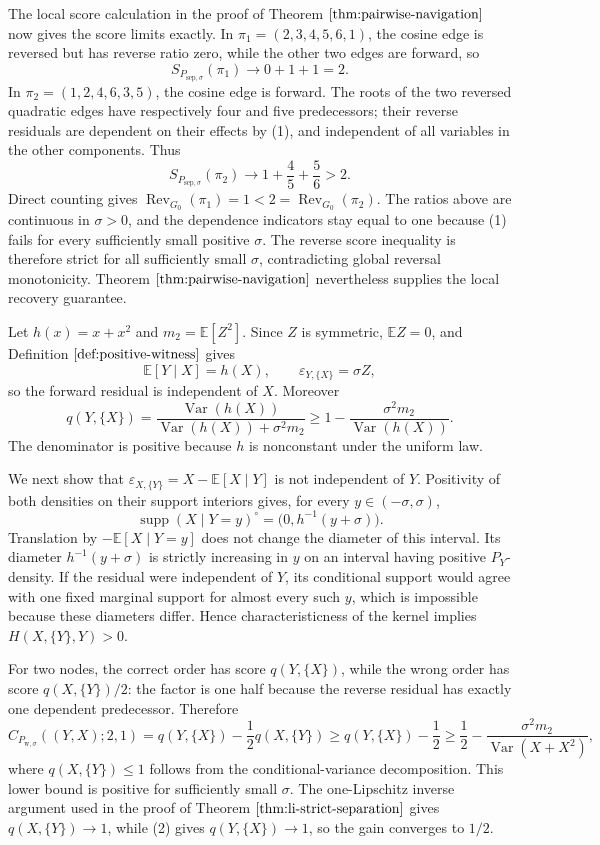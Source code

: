 The local score calculation in the proof of Theorem \(\ref{thm:pairwise-navigation}\) now gives the score limits exactly.  In \(\pi_1=(2,3,4,5,6,1)\), the cosine edge is reversed but has reverse ratio zero, while the other two edges are forward, so
\[
 S_{P_{\mathrm{sep},\sigma}}(\pi_1)\longrightarrow 0+1+1=2.
\]
In \(\pi_2=(1,2,4,6,3,5)\), the cosine edge is forward.  The roots of the two reversed quadratic edges have respectively four and five predecessors; their reverse residuals are dependent on their effects by (1), and independent of all variables in the other components.  Thus
\[
 S_{P_{\mathrm{sep},\sigma}}(\pi_2)\longrightarrow
 1+\frac45+\frac56>2.
\]
Direct counting gives \(\operatorname{Rev}_{G_0}(\pi_1)=1<2=\operatorname{Rev}_{G_0}(\pi_2)\).  The ratios above are continuous in \(\sigma>0\), and the dependence indicators stay equal to one because (1) fails for every sufficiently small positive \(\sigma\).  The reverse score inequality is therefore strict for all sufficiently small \(\sigma\), contradicting global reversal monotonicity.  Theorem \(\ref{thm:pairwise-navigation}\) nevertheless supplies the local recovery guarantee.

Let \(h(x)=x+x^2\) and \(m_2=\mathbb E[Z^2]\).  Since \(Z\) is symmetric, \(\mathbb E Z=0\), and Definition \(\ref{def:positive-witness}\) gives
\[
 \mathbb E[Y\mid X]=h(X),\qquad
 \varepsilon_{Y,\{X\}}=\sigma Z,
\]
so the forward residual is independent of \(X\).  Moreover
\[
 q(Y,\{X\})
 =\frac{\operatorname{Var}(h(X))}
 {\operatorname{Var}(h(X))+\sigma^2m_2}
 \ge 1-\frac{\sigma^2m_2}{\operatorname{Var}(h(X))}. \tag{2}
\]
The denominator is positive because \(h\) is nonconstant under the uniform law.

We next show that \(\varepsilon_{X,\{Y\}}=X-\mathbb E[X\mid Y]\) is not independent of \(Y\).  Positivity of both densities on their support interiors gives, for every \(y\in(-\sigma,\sigma)\),
\[
 \operatorname{supp}(X\mid Y=y)^{\circ}
 =\bigl(0,h^{-1}(y+\sigma)\bigr).
\]
Translation by \(-\mathbb E[X\mid Y=y]\) does not change the diameter of this interval.  Its diameter \(h^{-1}(y+\sigma)\) is strictly increasing in \(y\) on an interval having positive \(P_Y\)-density.  If the residual were independent of \(Y\), its conditional support would agree with one fixed marginal support for almost every such \(y\), which is impossible because these diameters differ.  Hence characteristicness of the kernel implies \(H(X,\{Y\},Y)>0\).

For two nodes, the correct order has score \(q(Y,\{X\})\), while the wrong order has score \(q(X,\{Y\})/2\): the factor is one half because the reverse residual has exactly one dependent predecessor.  Therefore
\[
 C_{P_{\mathrm w,\sigma}}((Y,X);2,1)
 =q(Y,\{X\})-\frac12q(X,\{Y\})
 \ge q(Y,\{X\})-\frac12
 \ge\frac12-\frac{\sigma^2m_2}{\operatorname{Var}(X+X^2)},
\]
where \(q(X,\{Y\})\le1\) follows from the conditional-variance decomposition.  This lower bound is positive for sufficiently small \(\sigma\).  The one-Lipschitz inverse argument used in the proof of Theorem \(\ref{thm:li-strict-separation}\) gives \(q(X,\{Y\})\to1\), while (2) gives \(q(Y,\{X\})\to1\), so the gain converges to \(1/2\).

